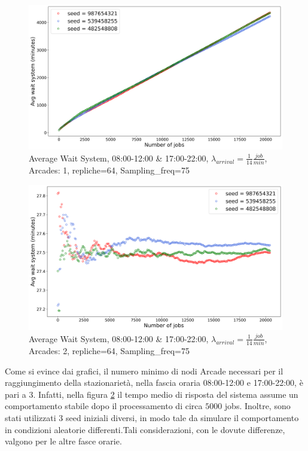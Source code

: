 \documentclass{article}
\begin{document}
\begin{figure}[H]
\centering
\captionsetup{justification=centering,margin=2cm}
\includegraphics[scale=0.48]{images/transient_mor_ns.png}
\caption{Average Wait System, 08:00-12:00 \& 17:00-22:00, $\lambda_{arrival}=\frac{1}{14} \frac{job}{min}$, Arcades: 1, repliche=64, Sampling\_freq=75}\label{figura:avg_ws_mor_ns}
\end{figure}
\begin{figure}[H]
\centering
\captionsetup{justification=centering,margin=2cm}
\includegraphics[scale=0.48]{images/transient_mor_s.png}
\caption{Average Wait System, 08:00-12:00 \& 17:00-22:00, $\lambda_{arrival}=\frac{1}{14} \frac{job}{min}$, Arcades: 2, repliche=64, Sampling\_freq=75}\label{figura:avg_ws_mor_s}
\end{figure}

Come si evince dai grafici, il numero minimo di nodi Arcade necessari per il raggiungimento della stazionarietà, nella fascia oraria 08:00-12:00 e 17:00-22:00, è pari a 3. Infatti, nella figura \ref{figura:avg_ws_mor_s} il tempo medio di risposta del sistema assume un comportamento stabile dopo il processamento di circa $5000$ jobs. Inoltre, sono stati utilizzati 3 seed iniziali diversi, in modo tale da simulare il comportamento in condizioni aleatorie differenti.Tali considerazioni, con le dovute differenze, valgono per le altre fasce orarie.
\end{document}
